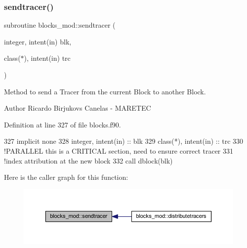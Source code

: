 \subsubsection{\texorpdfstring{sendtracer()}{sendtracer()}}
{\footnotesize\ttfamily subroutine blocks\+\_\+mod\+::sendtracer (\begin{DoxyParamCaption}\item[{integer, intent(in)}]{blk,  }\item[{class($\ast$), intent(in)}]{trc }\end{DoxyParamCaption})\hspace{0.3cm}{\ttfamily [private]}}



Method to send a Tracer from the current Block to another Block. 

\begin{DoxyAuthor}{Author}
Ricardo Birjukovs Canelas -\/ M\+A\+R\+E\+T\+EC 
\end{DoxyAuthor}


Definition at line 327 of file blocks.\+f90.


\begin{DoxyCode}
327     \textcolor{keywordtype}{implicit none}
328     \textcolor{keywordtype}{integer}, \textcolor{keywordtype}{intent(in)} :: blk
329     \textcolor{keywordtype}{class}(*), \textcolor{keywordtype}{intent(in)} :: trc
330     \textcolor{comment}{!PARALLEL this is a CRITICAL section, need to ensure correct tracer}
331     \textcolor{comment}{!index attribution at the new block}
332     \textcolor{keyword}{call }dblock(blk)%
\end{DoxyCode}
Here is the caller graph for this function\+:\nopagebreak
\begin{figure}[H]
\begin{center}
\leavevmode
\includegraphics[width=350pt]{namespaceblocks__mod_a5a9992de40470e417ec8e40e688f6a0e_icgraph}
\end{center}
\end{figure}
\mbox{\label{namespaceblocks__mod_a8f5a5d9e6cfd16cfd1b179092a204696}} 
